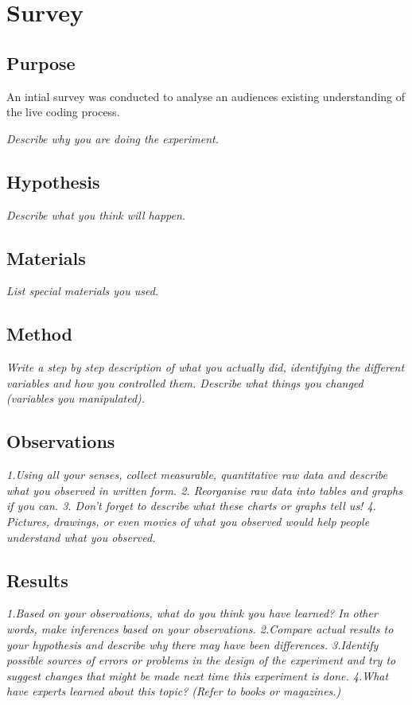 
\chapter{Survey}
\label{cha:survey}

\section{Purpose}

An intial survey was conducted to analyse an audiences existing understanding of the live coding process. 

\textit{Describe why you are doing the experiment.}

\section{Hypothesis}
\textit{Describe what you think will happen.}
\section{Materials}
\textit{List special materials you used.}
\section{Method}
\textit{Write a step by step description of what you actually did, identifying the different variables and how you controlled them. Describe what things you changed (variables you manipulated).}
\section{Observations}
\textit{1.Using all your senses, collect measurable, quantitative raw data and describe what you observed in written form.
2. Reorganise raw data into tables and graphs if you can.
3. Don't forget to describe what these charts or graphs tell us!
4. Pictures, drawings, or even movies of what you observed would help people understand what you observed.}
\section{Results}
\textit{1.Based on your observations, what do you think you have learned? In other words, make inferences based on your observations.
2.Compare actual results to your hypothesis and describe why there may have been differences.
3.Identify possible sources of errors or problems in the design of the experiment and try to suggest changes that might be made next time this experiment is done.
4.What have experts learned about this topic? (Refer to books or magazines.)}

